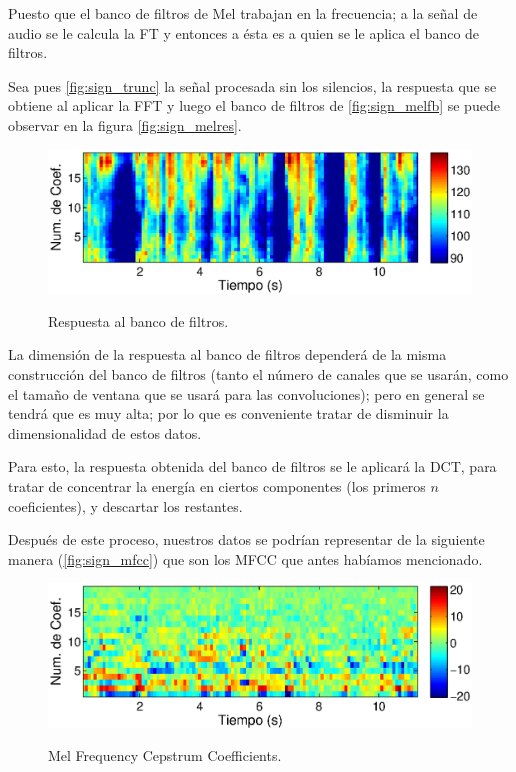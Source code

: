 Puesto que el banco de filtros de Mel trabajan en la frecuencia; a la señal de audio se le calcula la \ac{FT} y entonces a ésta es a quien se le aplica el banco de filtros.

Sea pues \autoref{fig:sign_trunc} la señal procesada sin los silencios, la respuesta que se obtiene al aplicar la \ac{FFT} y luego el banco de filtros de \autoref{fig:sign_melfb} se puede observar en la figura \autoref{fig:sign_melres}.
\begin{figure}[t]
  \myfloatalign
  {\includegraphics[width=0.9\linewidth]{gfx/chap2/mfcc_result2}} \quad
  \caption{Respuesta al banco de filtros.}
  \label{fig:sign_melres}
\end{figure}

La dimensión de la respuesta al banco de filtros dependerá de la misma construcción del banco de filtros (tanto el número de canales que se usarán, como el tamaño de ventana que se usará para las convoluciones); pero en general se tendrá que es muy alta; por lo que es conveniente tratar de disminuir la dimensionalidad de estos datos.

Para esto, la respuesta obtenida del banco de filtros se le aplicará la \ac{DCT}, para tratar de concentrar la energía en ciertos componentes (los primeros $n$ coeficientes), y descartar los restantes.

Después de este proceso, nuestros datos se podrían representar de la siguiente manera (\autoref{fig:sign_mfcc}) que son los \ac{MFCC} que antes habíamos mencionado.
\begin{figure}[t]
  \myfloatalign
  {\includegraphics[width=0.9\linewidth]{gfx/chap2/mfcc_result3}} \quad
  \caption{Mel Frequency Cepstrum Coefficients.}
  \label{fig:sign_mfcc}
\end{figure}

